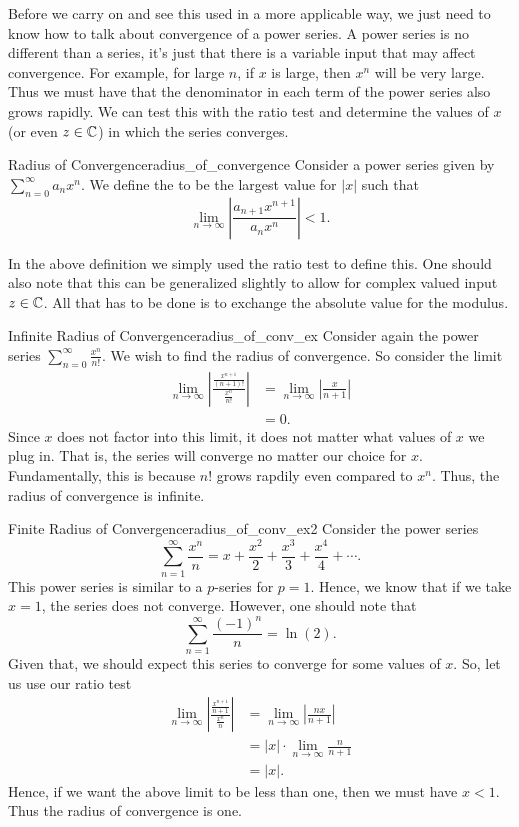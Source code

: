 Before we carry on and see this used in a more applicable way, we just need to know how to talk about convergence of a power series.  A power series is no different than a series, it's just that there is a variable input that may affect convergence.  For example, for large $n$, if $x$ is large, then $x^n$ will be very large.  Thus we must have that the denominator in each term of the power series also grows rapidly. We can test this with the ratio test and determine the values of $x$ (or even $z\in \mathbb{C}$) in which the series converges.

\begin{df}{Radius of Convergence}{radius_of_convergence}
Consider a power series given by $\sum_{n=0}^\infty a_n x^n$.  We define the  to be the largest value for $|x|$ such that
\[
\lim_{n\to \infty} \left| \frac{a_{n+1}x^{n+1}}{a_n x^n}\right| < 1.
\]
\end{df}

In the above definition we simply used the ratio test to define this. One should also note that this can be generalized slightly to allow for complex valued input $z\in \mathbb{C}$.  All that has to be done is to exchange the absolute value for the modulus.

\begin{ex}{Infinite Radius of Convergence}{radius_of_conv_ex}
Consider again the power series $\sum_{n=0}^\infty \frac{x^n}{n!}$. We wish to find the radius of convergence.  So consider the limit
\begin{align*}
    \lim_{n\to \infty} \left| \frac{\frac{x^{n+1}}{(n+1)!}}{\frac{x^n}{n!}}\right|&= \lim_{n\to \infty} \left| \frac{x}{n+1}\right|\\
    &= 0.
\end{align*}
Since $x$ does not factor into this limit, it does not matter what values of $x$ we plug in. That is, the series will converge no matter our choice for $x$. Fundamentally, this is because $n!$ grows rapdily even compared to $x^n$. Thus, the radius of convergence is infinite.
\end{ex}

\begin{ex}{Finite Radius of Convergence}{radius_of_conv_ex2}
Consider the power series
\[
\sum_{n=1}^\infty \frac{x^n}{n} = x + \frac{x^2}{2}+\frac{x^3}{3}+\frac{x^4}{4}+\cdots.
\]
This power series is similar to a $p$-series for $p=1$.  Hence, we know that if we take $x=1$, the series does not converge.  However, one should note that
\[
\sum_{n=1}^\infty \frac{(-1)^n}{n} = \ln(2).
\]
Given that, we should expect this series to converge for some values of $x$. So, let us use our ratio test
\begin{align*}
    \lim_{n\to \infty} \left| \frac{\frac{x^{n+1}}{n+1}}{\frac{x^n}{n}}\right| &= \lim_{n\to \infty} \left| \frac{nx}{n+1} \right|\\
    &= |x| \cdot \lim_{n\to \infty} \frac{n}{n+1} \\
    &= |x|.
\end{align*}
Hence, if we want the above limit to be less than one, then we must have $x<1$. Thus the radius of convergence is one.
\end{ex}

